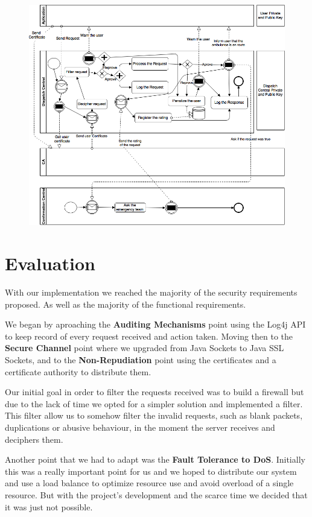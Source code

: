 \documentclass[a4paper,titlepage,11pt]{article}
\begin{document}
\begin{figure}[ht]
    \centering
    \includegraphics[scale=0.45]{img/advanced-solution.png}
\end{figure}

\section{Evaluation}
With our implementation we reached the majority of the security requirements proposed. As well as the majority of the
functional requirements.

We began by aproaching the \textbf{Auditing Mechanisms} point using the Log4j API to keep record of every request received and
action taken. Moving then to the \textbf{Secure Channel} point where we upgraded from Java Sockets to Java SSL Sockets, and to the
\textbf{Non-Repudiation} point using the certificates and a certificate authority to distribute them.

Our initial goal in order to filter the requests received was to build a firewall but due to the lack of time we opted for a
simpler solution and implemented a filter. This filter allow us to somehow filter the invalid requests, such as blank packets, duplications or abusive behaviour, in the moment the server
receives and deciphers them.

Another point that we had to adapt was the \textbf{Fault Tolerance to DoS}. Initially this was a really important point for us and we
hoped to distribute our system and use a load balance to optimize resource use and avoid overload of a single resource. But with the
project's development and the scarce time we decided that it was just not possible.
\end{document}
